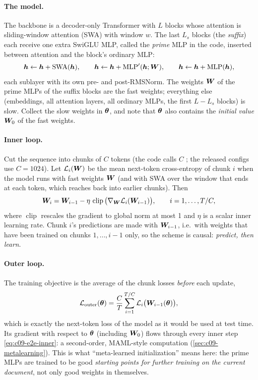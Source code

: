 \paragraph{The model.} The backbone is a decoder-only Transformer with $L$ blocks whose
attention is sliding-window attention (SWA) with window $w$. The last $L_s$ blocks (the
\emph{suffix}) each receive one extra SwiGLU MLP, called the \emph{prime} MLP in the code,
inserted between attention and the block's ordinary MLP:
\begin{equation}
  \bm{h} \gets \bm{h} + \operatorname{SWA}(\bm{h}), \qquad
  \bm{h} \gets \bm{h} + \operatorname{MLP}'(\bm{h}; \bm{W}), \qquad
  \bm{h} \gets \bm{h} + \operatorname{MLP}(\bm{h}),
\end{equation}
each sublayer with its own pre- and post-RMSNorm. The weights $\bm{W}$ of the prime MLPs of the
suffix blocks are the fast weights; everything else (embeddings, all attention layers, all
ordinary MLPs, the first $L - L_s$ blocks) is slow. Collect the slow weights in $\bm{\theta}$, and
note that $\bm{\theta}$ also contains the \emph{initial value} $\bm{W}_0$ of the fast weights.

\paragraph{Inner loop.} Cut the sequence into chunks of $C$ tokens (the code calls $C$
; the released configs use $C = 1024$). Let $\mathcal{L}_i(\bm{W})$ be the mean
next-token cross-entropy of chunk $i$ when the model runs with fast weights $\bm{W}$ (and with
SWA over the window that ends at each token, which reaches back into earlier chunks). Then
\begin{equation}\label{eq:c09-e2e-inner}
  \bm{W}_i = \bm{W}_{i-1} - \eta\,\operatorname{clip}\big(\nabla_{\bm{W}}\mathcal{L}_i(\bm{W}_{i-1})\big),
  \qquad i = 1, \dots, T/C,
\end{equation}
where $\operatorname{clip}$ rescales the gradient to global norm at most 1 and $\eta$ is a
scalar inner learning rate. Chunk $i$'s predictions are made with $\bm{W}_{i-1}$, i.e.\ with
weights that have been trained on chunks $1,\dots,i-1$ only, so the scheme is causal:
\emph{predict, then learn}.

\paragraph{Outer loop.} The training objective is the average of the chunk losses
\emph{before} each update,
\begin{equation}\label{eq:c09-e2e-outer}
  \mathcal{L}_{\text{outer}}(\bm{\theta}) = \frac{C}{T}\sum_{i=1}^{T/C}\mathcal{L}_i\big(\bm{W}_{i-1}(\bm{\theta})\big),
\end{equation}
which is exactly the next-token loss of the model as it would be used at test time. Its
gradient with respect to $\bm{\theta}$ (including $\bm{W}_0$) flows through every inner step
\eqref{eq:c09-e2e-inner}: a second-order, MAML-style computation
(\cref{sec:c09-metalearning}). This is what ``meta-learned initialization'' means here: the
prime MLPs are trained to be good \emph{starting points for further training on the current
document}, not only good weights in themselves.

